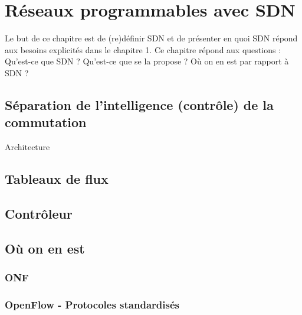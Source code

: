 \chapter{Réseaux programmables avec SDN}

Le but de ce chapitre est de (re)définir SDN et de présenter en quoi SDN répond aux besoins explicités dans le chapitre 1.
Ce chapitre répond aux questions : Qu'est-ce que SDN ? Qu'est-ce que se la propose ? Où on en est par rapport à SDN ?

\section{Séparation de l'intelligence (contrôle) de la commutation}

Architecture

\section{Tableaux de flux}

\section{Contrôleur}

\section{Où on en est}
\subsection{ONF}

\subsection{OpenFlow - Protocoles standardisés}
